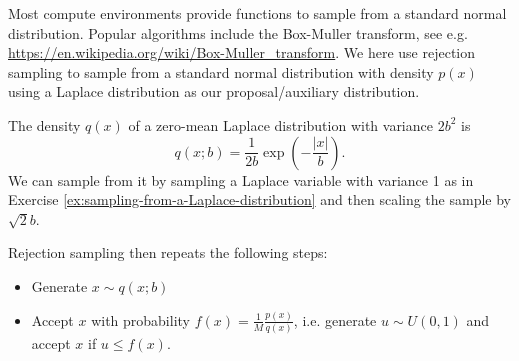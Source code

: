 \label{ex:rejection-sampling}
Most compute environments provide functions to sample from a standard
normal distribution. Popular algorithms include the Box-Muller
transform, see
e.g. \url{https://en.wikipedia.org/wiki/Box-Muller_transform}. We here
use rejection sampling to sample from a standard normal distribution
with density $p(x)$ using a Laplace distribution as our
proposal/auxiliary distribution.

The density $q(x)$ of a zero-mean Laplace distribution with variance
$2b^2$ is
\begin{equation}
  q(x;b) = \frac{1}{2b}\exp\left(-\frac{|x|}{b}\right).
\end{equation}
We can sample from it by sampling a Laplace variable with variance 1
as in Exercise \ref{ex:sampling-from-a-Laplace-distribution} and then
scaling the sample by $\sqrt{2}b$.

Rejection sampling then repeats the following steps:
\begin{itemize}
  \item Generate $x \sim q(x; b)$
  \item Accept $x$ with probability $f(x) = \frac{1}{M}
    \frac{p(x)}{q(x)}$, i.e. generate $u \sim U(0,1)$ and accept $x$
    if $u \le f(x)$.
\end{itemize}

